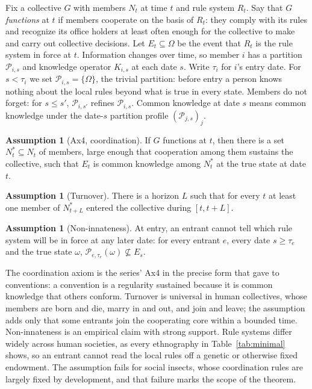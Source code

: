 \documentclass[11pt,letterpaper]{article}
\theoremstyle{definition}
\newtheorem{assumption}[theorem]{Assumption}
\theoremstyle{remark}
\begin{document}
Fix a collective $G$ with members $N_t$ at time $t$ and rule system $R_t$. Say that $G$ \emph{functions} at $t$ if members cooperate on the basis of $R_t$: they comply with its rules and recognize its office holders at least often enough for the collective to make and carry out collective decisions. Let $E_t\subseteq\Omega$ be the event that $R_t$ is the rule system in force at $t$. Information changes over time, so member $i$ has a partition $\mathcal{P}_{i,s}$ and knowledge operator $K_{i,s}$ at each date $s$. Write $\tau_i$ for $i$'s entry date. For $s<\tau_i$ we set $\mathcal{P}_{i,s}=\{\Omega\}$, the trivial partition: before entry a person knows nothing about the local rules beyond what is true in every state. Members do not forget: for $s\le s'$, $\mathcal{P}_{i,s'}$ refines $\mathcal{P}_{i,s}$. Common knowledge at date $s$ means common knowledge under the date-$s$ partition profile $(\mathcal{P}_{j,s})_j$.

\begin{assumption}[Ax4, coordination]
\label{ax:coordination}
If $G$ functions at $t$, then there is a set $N^\ast_t\subseteq N_t$ of members, large enough that cooperation among them sustains the collective, such that $E_t$ is common knowledge among $N^\ast_t$ at the true state at date $t$.
\end{assumption}

\begin{assumption}[Turnover]
\label{ax:turnover}
There is a horizon $L$ such that for every $t$ at least one member of $N^\ast_{t+L}$ entered the collective during $[t,t+L]$.
\end{assumption}

\begin{assumption}[Non-innateness]
\label{ax:noninnate}
At entry, an entrant cannot tell which rule system will be in force at any later date: for every entrant $e$, every date $s\geq\tau_e$ and the true state $\omega$, $\mathcal{P}_{e,\tau_e}(\omega)\not\subseteq E_s$.
\end{assumption}

The coordination axiom is the series' Ax4 in the precise form that \citet{lewis1969} gave to conventions: a convention is a regularity sustained because it is common knowledge that others conform. Turnover is universal in human collectives, whose members are born and die, marry in and out, and join and leave; the assumption adds only that some entrants join the cooperating core within a bounded time. Non-innateness is an empirical claim with strong support. Rule systems differ widely across human societies, as every ethnography in Table~\ref{tab:minimal} shows, so an entrant cannot read the local rules off a genetic or otherwise fixed endowment. The assumption fails for social insects, whose coordination rules are largely fixed by development, and that failure marks the scope of the theorem.
\end{document}
